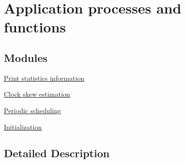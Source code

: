 \hypertarget{group__chaos-test-processes}{\section{Application processes and functions}
\label{group__chaos-test-processes}
}
\subsection*{Modules}
\begin{DoxyCompactItemize}
\item 
\hyperlink{group__chaos-test-print-stats}{Print statistics information}
\item 
\hyperlink{group__chaos-test-skew}{Clock skew estimation}
\item 
\hyperlink{group__chaos-test-scheduler}{Periodic scheduling}
\item 
\hyperlink{group__chaos-test-init}{Initialization}
\end{DoxyCompactItemize}


\subsection{Detailed Description}
